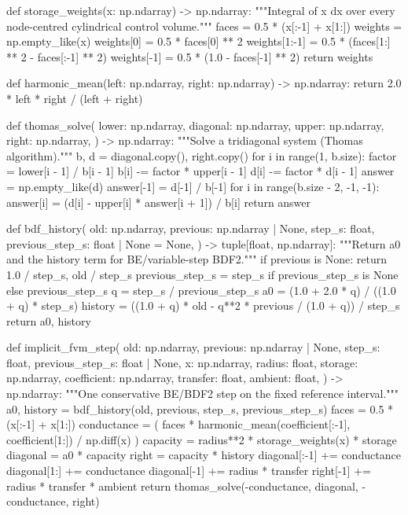 \documentclass[withoutpreface,bwprint]{cumcmthesis}
\begin{document}
\begin{PythonCode}
def storage_weights(x: np.ndarray) -> np.ndarray:
    """Integral of x dx over every node-centred cylindrical control volume."""
    faces = 0.5 * (x[:-1] + x[1:])
    weights = np.empty_like(x)
    weights[0] = 0.5 * faces[0] ** 2
    weights[1:-1] = 0.5 * (faces[1:] ** 2 - faces[:-1] ** 2)
    weights[-1] = 0.5 * (1.0 - faces[-1] ** 2)
    return weights


def harmonic_mean(left: np.ndarray, right: np.ndarray) -> np.ndarray:
    return 2.0 * left * right / (left + right)


def thomas_solve(
    lower: np.ndarray, diagonal: np.ndarray,
    upper: np.ndarray, right: np.ndarray,
) -> np.ndarray:
    """Solve a tridiagonal system (Thomas algorithm)."""
    b, d = diagonal.copy(), right.copy()
    for i in range(1, b.size):
        factor = lower[i - 1] / b[i - 1]
        b[i] -= factor * upper[i - 1]
        d[i] -= factor * d[i - 1]
    answer = np.empty_like(d)
    answer[-1] = d[-1] / b[-1]
    for i in range(b.size - 2, -1, -1):
        answer[i] = (d[i] - upper[i] * answer[i + 1]) / b[i]
    return answer


def bdf_history(
    old: np.ndarray,
    previous: np.ndarray | None,
    step_s: float,
    previous_step_s: float | None = None,
) -> tuple[float, np.ndarray]:
    """Return a0 and the history term for BE/variable-step BDF2."""
    if previous is None:
        return 1.0 / step_s, old / step_s
    previous_step_s = step_s if previous_step_s is None else previous_step_s
    q = step_s / previous_step_s
    a0 = (1.0 + 2.0 * q) / ((1.0 + q) * step_s)
    history = ((1.0 + q) * old - q**2 * previous / (1.0 + q)) / step_s
    return a0, history


def implicit_fvm_step(
    old: np.ndarray,
    previous: np.ndarray | None,
    step_s: float,
    previous_step_s: float | None,
    x: np.ndarray,
    radius: float,
    storage: np.ndarray,
    coefficient: np.ndarray,
    transfer: float,
    ambient: float,
) -> np.ndarray:
    """One conservative BE/BDF2 step on the fixed reference interval."""
    a0, history = bdf_history(old, previous, step_s, previous_step_s)
    faces = 0.5 * (x[:-1] + x[1:])
    conductance = (
        faces * harmonic_mean(coefficient[:-1], coefficient[1:]) / np.diff(x)
    )
    capacity = radius**2 * storage_weights(x) * storage
    diagonal = a0 * capacity
    right = capacity * history
    diagonal[:-1] += conductance
    diagonal[1:] += conductance
    diagonal[-1] += radius * transfer
    right[-1] += radius * transfer * ambient
    return thomas_solve(-conductance, diagonal, -conductance, right)



\end{PythonCode}
\end{document}
